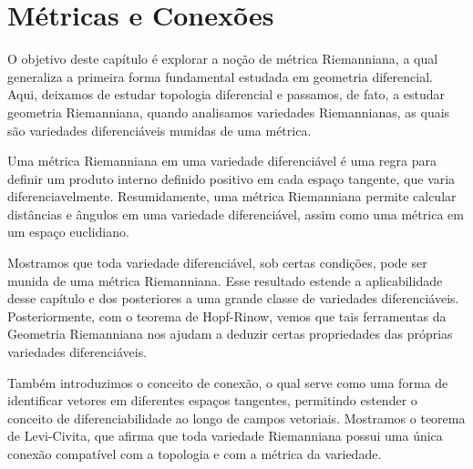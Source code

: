 
\chapter{Métricas e Conexões}
\label{cap:metricas-conexoes}
O objetivo deste capítulo é explorar a noção de métrica Riemanniana, a qual generaliza a primeira forma fundamental estudada em geometria diferencial. Aqui, deixamos de estudar topologia diferencial e passamos, de fato, a estudar geometria Riemanniana, quando analisamos variedades Riemannianas, as quais são variedades diferenciáveis munidas de uma métrica.

Uma métrica Riemanniana em uma variedade diferenciável é uma regra para definir um produto interno definido positivo em cada espaço tangente, que varia diferenciavelmente. Resumidamente, uma métrica Riemanniana permite calcular distâncias e ângulos em uma variedade diferenciável, assim como uma métrica em um espaço euclidiano.

Mostramos que toda variedade diferenciável, sob certas condições, pode ser munida de uma métrica Riemanniana. Esse resultado estende a aplicabilidade desse capítulo e dos posteriores a uma grande classe de variedades diferenciáveis. Posteriormente, com o teorema de Hopf-Rinow, vemos que tais ferramentas da Geometria Riemanniana nos ajudam a deduzir certas propriedades das próprias variedades diferenciáveis.

Também introduzimos o conceito de conexão, o qual serve como uma forma de identificar vetores em diferentes espaços tangentes, permitindo estender o conceito de diferenciabilidade ao longo de campos vetoriais. Mostramos o teorema de Levi-Civita, que afirma que toda variedade Riemanniana possui uma única conexão compatível com a topologia e com a métrica da variedade.
